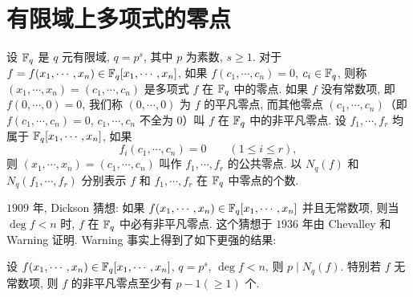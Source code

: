 \section{有限域上多项式的零点}\label{sec:ch9-s2}

设 $\mathbb{F}_q$ 是 $q$ 元有限域, $q=p^s$, 其中 $p$ 为素数, $s\geqslant 1$. 对于 $f=f(x_1,\cdots,x_n)\in\mathbb{F}_q[x_1,\cdots,x_n]$, 如果 $f(c_1,\cdots,c_n)=0$, $c_i\in\mathbb{F}_q$, 则称 $(x_1,\cdots,x_n)=(c_1,\cdots,c_n)$ 是多项式 $f$ 在 $\mathbb{F}_q$ 中的零点. 如果 $f$ 没有常数项, 即 $f(0,\cdots,0)=0$, 我们称 $(0,\cdots,0)$ 为 $f$ 的平凡零点, 而其他零点 $(c_1,\cdots,c_n)$（即 $f(c_1,\cdots,c_n)=0$, $c_1,\cdots,c_n$ 不全为 $0$）叫 $f$ 在 $\mathbb{F}_q$ 中的非平凡零点. 设 $f_1,\cdots,f_r$ 均属于 $\mathbb{F}_q[x_1,\cdots,x_n]$, 如果
\[
  f_i(c_1,\cdots,c_n)=0\qquad(1\leqslant i\leqslant r),
\]
则 $(x_1,\cdots,x_n)=(c_1,\cdots,c_n)$ 叫作 $f_1,\cdots,f_r$ 的公共零点. 以 $N_q(f)$ 和 $N_q(f_1,\cdots,f_r)$ 分别表示 $f$ 和 $f_1,\cdots,f_r$ 在 $\mathbb{F}_q$ 中零点的个数.

$1909$ 年, Dickson 猜想: 如果 $f(x_1,\cdots,x_n)\in\mathbb{F}_q[x_1,\cdots,x_n]$ 并且无常数项, 则当 $\deg f<n$ 时, $f$ 在 $\mathbb{F}_q$ 中必有非平凡零点. 这个猜想于 $1936$ 年由 Chevalley 和 Warning 证明. Warning 事实上得到了如下更强的结果:

\begin{theorem}\label{thm:9.3}
设 $f(x_1,\cdots,x_n)\in\mathbb{F}_q[x_1,\cdots,x_n]$, $q=p^s$, $\deg f<n$, 则 $p\mid N_q(f)$. 特别若 $f$ 无常数项, 则 $f$ 的非平凡零点至少有 $p-1(\geqslant 1)$ 个.
\end{theorem}

